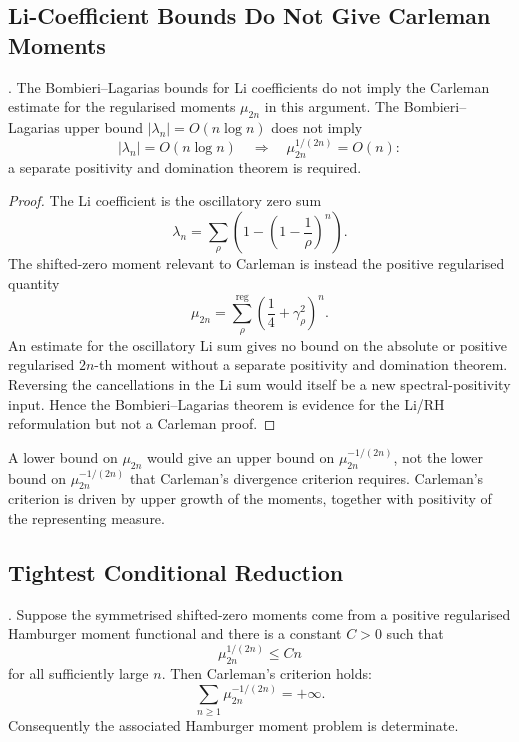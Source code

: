 \subsection{Li-Coefficient Bounds Do Not Give Carleman Moments}
\label{v4-arith:hpar-det:carleman-BL}

\begin{proposition}
\label{v4-arith:hpar-det:prop:BL-carleman-partial}
\ClaimStatusProvedHere. The Bombieri--Lagarias bounds for Li
coefficients do not imply the Carleman estimate for the
regularised moments \(\mu_{2n}\) in this argument.
The Bombieri--Lagarias upper bound \(|\lambda_n| = O(n\log n)\)
does not imply
\[
 |\lambda_{n}|=O(n\log n)
 \quad\Longrightarrow\quad
 \mu_{2n}^{1/(2n)}=O(n):
\]
a separate positivity and domination theorem is required.
\end{proposition}

\begin{proof}
The Li coefficient is the oscillatory zero sum
\[
 \lambda_{n}=\sum_{\rho}\left(1-\left(1-\frac1{\rho}\right)^{n}\right).
\]
The shifted-zero moment relevant to Carleman is instead the positive
regularised quantity
\[
 \mu_{2n}=\sum_{\rho}^{\mathrm{reg}}\left(\frac14+\gamma_{\rho}^{2}\right)^{n}.
\]
An estimate for the oscillatory Li sum gives no bound on the absolute
or positive regularised \(2n\)-th moment without a separate positivity
and domination theorem. Reversing the cancellations in the Li sum
would itself be a new spectral-positivity input. Hence the
Bombieri--Lagarias theorem is evidence for the Li/RH reformulation but
not a Carleman proof.
\end{proof}

\begin{remark}
\label{v4-arith:hpar-det:rem:carleman-not-decided}
A lower bound on
\(\mu_{2n}\) would give an upper bound on
\(\mu_{2n}^{-1/(2n)}\), not the lower bound on
\(\mu_{2n}^{-1/(2n)}\) that Carleman's divergence criterion requires.
Carleman's criterion is driven by upper growth of the
moments, together with positivity of the representing measure.
\end{remark}

\subsection{Tightest Conditional Reduction}
\label{v4-arith:hpar-det:tightest-reduction}

\begin{theorem}
\label{v4-arith:hpar-det:thm:carleman-reformulation}
\ClaimStatusProvedHere. Suppose the symmetrised shifted-zero moments
come from a positive regularised Hamburger moment functional and
there is a constant \(C>0\) such that
\begin{equation}
\label{v4-arith:hpar-det:eq:sharp-asymptotic}
 \mu_{2n}^{1/(2n)}\le Cn
\end{equation}
for all sufficiently large \(n\). Then Carleman's criterion holds:
\[
 \sum_{n\ge1}\mu_{2n}^{-1/(2n)}=+\infty.
\]
Consequently the associated Hamburger moment problem is determinate.
\end{theorem}


